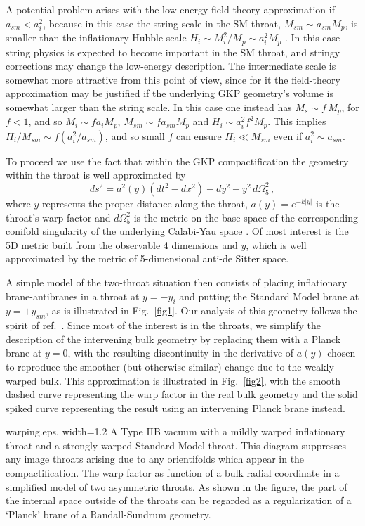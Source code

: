 \documentclass[12pt]{JHEP3}
\def\beq{\begin{equation}}
\def\eeq{\end{equation}}
\begin{document}
A potential problem arises with the low-energy field theory
approximation if $a_{sm} < a_i^2$, because in this case the string
scale in the SM throat, $M_{sm} \sim a_{sm} M_p$, is smaller than
the inflationary Hubble scale $H_i \sim M_i^2/M_p \sim a_i^2 M_p$
\cite{Rob}. In this case string physics is expected to become
important in the SM throat, and stringy corrections may
change the low-energy description. The intermediate
scale is somewhat more attractive from this point of view, since
for it the field-theory approximation may be justified if the
underlying GKP geometry's volume is somewhat larger than the
string scale. In this case one instead has $M_s \sim f \, M_p$,
for $f < 1$, and so $M_i \sim f a_i M_p$, $M_{sm} \sim f a_{sm}
M_p$ and $H_i \sim a_i^2 f^2 M_p$. This implies $H_i/M_{sm} \sim f
(a_i^2/a_{sm})$, and so small $f$ can ensure $H_i \ll M_{sm}$ even
if $a_i^2 \sim a_{sm}$.

To proceed we use the fact that within the GKP compactification the
geometry within the throat is well approximated by
%
\beq \label{RS}
    ds^2 = a^2(y)(dt^2 - dx^2) - dy^2 - y^2 \, d\Omega^2_5 \,,
\eeq
%
where $y$ represents the proper distance along the throat, $a(y) =
e^{-k|y|}$ is the throat's warp factor and $d\Omega^2_5$ is the
metric on the base space of the corresponding conifold singularity
of the underlying Calabi-Yau space \cite{throatmetric}. Of most
interest is the 5D metric built from the observable 4 dimensions
and $y$, which is well approximated by the metric of 5-dimensional
anti-de Sitter space.

A simple model of the two-throat situation then consists of
placing inflationary brane-antibranes in a throat at $y=-y_i$ and
putting the Standard Model brane at $y=+y_{sm}$, as is illustrated
in Fig.~\ref{fig1}. Our analysis of this geometry follows the
spirit of ref.~\cite{dkkls}. Since most of the interest is in the
throats, we simplify the description of the intervening bulk
geometry by replacing them with a Planck brane at $y=0$, with the
resulting discontinuity in the derivative of $a(y)$ chosen to
reproduce the smoother (but otherwise similar) change due to the
weakly-warped bulk. This approximation is illustrated in
Fig.~\ref{fig2}, with the smooth dashed curve representing the
warp factor in the real bulk geometry and the solid spiked curve
representing the result using an intervening Planck brane instead.

 {warping.eps,
width=1.2  \hsize}{A Type IIB vacuum with a mildly warped
inflationary throat and a strongly warped Standard Model throat.
This diagram suppresses any image throats arising due to any
orientifolds which appear in the compactification.\label{fig1}}
{The warp factor as function of a bulk radial coordinate in a
simplified model of two asymmetric throats. As shown in the
figure, the part of the internal space outside of the throats can
be regarded as a regularization of a `Planck' brane of a
Randall-Sundrum geometry.\label{fig2}}
\end{document}

